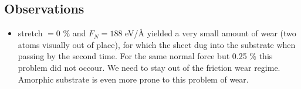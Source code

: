 \newpage
\subsection*{Observations}



\begin{itemize}
  \item stretch $= 0$ \% and $F_N = 188$ eV/Å yielded a very small amount of wear (two atoms visually out of place), for which the sheet dug into the substrate when passing by the second time. For the same normal force but 0.25 \% this problem did not occour. We need to stay out of the friction wear regime. Amorphic substrate is even more prone to this problem of wear.
\end{itemize}